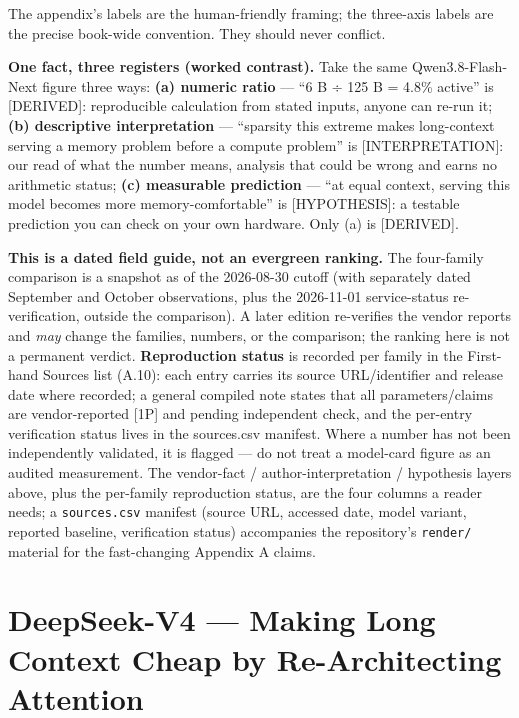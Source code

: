 The appendix's labels are the human-friendly framing; the three-axis
labels are the precise book-wide convention. They should never conflict.

\textbf{One fact, three registers (worked contrast).} Take the same
Qwen3.8-Flash-Next figure three ways: \textbf{(a) numeric ratio} --- ``6
B ÷ 125 B = 4.8\% active'' is \mbox{{[}DERIVED{]}}: reproducible calculation
from stated inputs, anyone can re-run it; \textbf{(b) descriptive
interpretation} --- ``sparsity this extreme makes long-context serving a
memory problem before a compute problem'' is \mbox{{[}INTERPRETATION{]}}: our
read of what the number means, analysis that could be wrong and earns no
arithmetic status; \textbf{(c) measurable prediction} --- ``at equal
context, serving this model becomes more memory-comfortable'' is
\mbox{{[}HYPOTHESIS{]}}: a testable prediction you can check on your own
hardware. Only (a) is \mbox{{[}DERIVED{]}}.

\textbf{This is a dated field guide, not an evergreen ranking.} The
four-family comparison is a snapshot as of the 2026-08-30 cutoff (with
separately dated September and October observations, plus the 2026-11-01
service-status re-verification, outside the comparison). A later edition
re-verifies the vendor reports and \emph{may} change the families,
numbers, or the comparison; the ranking here is not a permanent verdict.
\textbf{Reproduction status} is recorded per family in the First-hand
Sources list (A.10): each entry carries its source URL/identifier and
release date where recorded; a general compiled note states that all
parameters/claims are vendor-reported \mbox{{[}1P{]}} and pending independent
check, and the per-entry verification status lives in the sources.csv
manifest. Where a number has not been independently validated, it is
flagged --- do not treat a model-card figure as an audited measurement.
The vendor-fact / author-interpretation / hypothesis layers above, plus
the per-family reproduction status, are the four columns a reader needs;
a \texttt{sources.csv} manifest (source URL, accessed date, model
variant, reported baseline, verification status) accompanies the
repository's \texttt{render/} material for the fast-changing Appendix A
claims.

\section{DeepSeek-V4 --- Making Long Context Cheap by Re-Architecting
Attention}\label{deepseek-v4-making-long-context-cheap-by-re-architecting-attention}

